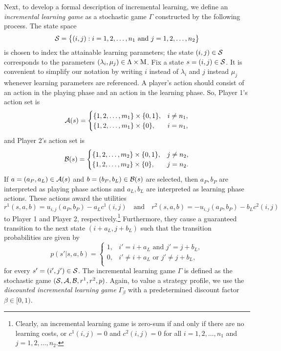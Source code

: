     Next, to develop a formal description of incremental learning, we define an \emph{incremental learning game} as a stochastic game $\Gamma$ constructed by the following process.
    The state space
    \[
        \mathcal{S} 
            = \big\{(i, j) : i = 1, 2, \ldots, n_1 \text{ and } j = 1, 2, \ldots, n_2\big\}
    \]
    is chosen to index the attainable learning parameters; the state $(i, j) \in \mathcal{S}$ corresponds to the parameters $(\lambda_i, \mu_j) \in \Lambda \times \mathrm{M}$.
    Fix a state $s = (i, j) \in \mathcal{S}$.
    It is convenient to simplify our notation by writing $i$ instead of $\lambda_i$ and $j$ instead $\mu_j$ whenever learning parameters are referenced.
    A player's action should consist of an action in the playing phase and an action in the learning phase.
    So, Player 1's action set is
    \[
        \mathcal{A}(s)
            = 
            \begin{cases}
                \{1, 2, \ldots, m_1\} \times \{0, 1\}, & i \neq n_1, \\
                \{1, 2, \ldots, m_1\} \times \{0\}, & i = n_1, \\
            \end{cases}
    \]
    and Player 2's action set is
    \[
        \mathcal{B}(s)
            = 
            \begin{cases}
                \{1, 2, \ldots, m_2\} \times \{0, 1\}, & j \neq n_2, \\
                \{1, 2, \ldots, m_2\} \times \{0\}, & j = n_2. \\
            \end{cases}
    \]
    If $a = (a_P, a_L) \in \mathcal{A}(s)$ and $b = (b_P, b_L) \in \mathcal{B}(s)$ are selected, then $a_P, b_P$ are interpreted as playing phase actions and $a_L, b_L$ are interpreted as learning phase actions.
    These actions award the utilities
    \[
        r^1(s, a, b)
            = u_{i, j}(a_P, b_P) - a_L c^1(i, j)
        \quad\text{and}\quad
        r^2(s, a, b)
            = -u_{i, j}(a_P, b_P) - b_L c^2(i, j)
    \]
    to Player 1 and Player 2, respectively.\footnote{Clearly,
        an incremental learning game is zero-sum if and only if there are no learning costs, or $c^1(i, j) = 0$ and $c^2(i, j) = 0$ for all $i = 1, 2, \ldots, n_1$ and $j = 1, 2, \ldots, n_2$.
    }
    Furthermore, they cause a guaranteed transition to the next state $(i + a_L, j + b_L)$ such that the transition probabilities are given by
    \[
        p(s' | s, a, b)
            =
            \begin{cases}
                1, & i' = i + a_L \text{ and } j' = j + b_L, \\
                0, & i' \neq i + a_L \text{ or } j' \neq j + b_L, \\
            \end{cases}
    \]
    for every $s' = (i', j') \in \mathcal{S}$.
    The incremental learning game $\Gamma$ is defined as the stochastic game $(\mathcal{S}, \mathcal{A}, \mathcal{B}, r^1, r^2, p)$.
    Again, to value a strategy profile, we use the \emph{discounted incremental learning game} $\Gamma_\beta$ with a predetermined discount factor $\beta \in [0, 1)$.

